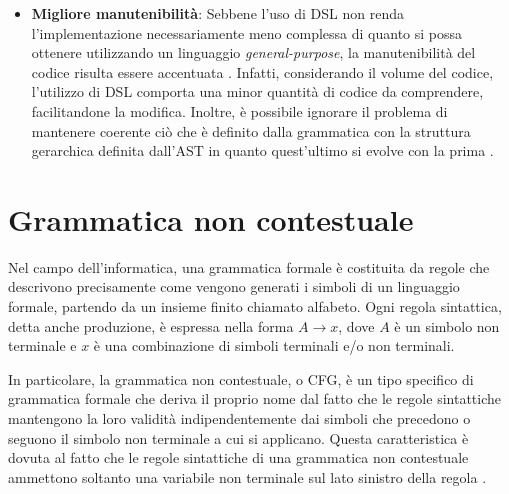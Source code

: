 \documentclass[12pt,a4paper,openright,twoside]{book}
\begin{document}
\begin{itemize}
    qualità del codice generato è chiaramente migliore [...] perché il linguaggio di modellazione è stato progettato per adattarsi 
    all'architettura del nostro terminale''\footnote{Di seguito riportata l'affermazione citata, in lingua originale:``the quality of the 
    generated code is clearly better, simply because the modelling language was designed to fit our terminal architecture''}. Inoltre, 
    l'offuscamento della reale complessità del problema, dovuto all'utilizzo di \ac{DSL}, consente ai nuovi sviluppatori di lavorare ad un 
    alto livello d'astrazione, senza dover conoscere tutti i dettagli inerenti all'implementazione del linguaggio \cite{EADS}. 
    \item \textbf{Migliore manutenibilità}: Sebbene l'uso di \ac{DSL} non renda l'implementazione necessariamente meno complessa di quanto 
    si possa ottenere utilizzando un linguaggio \textit{general-purpose}, la manutenibilità del codice risulta essere accentuata %
    \cite{Klint2010}.  Infatti, considerando il volume del codice, l'utilizzo di \ac{DSL} comporta una minor quantità di codice da comprendere, 
    facilitandone la modifica. Inoltre, è possibile  ignorare il problema di mantenere coerente ciò che è definito dalla grammatica con la 
    struttura gerarchica definita dall'\ac{AST} in quanto quest'ultimo si evolve con la prima \cite{Brabrand2010}.
\end{itemize}

\section{Grammatica non contestuale}
Nel campo dell’informatica, una grammatica formale è costituita da regole che descrivono precisamente come vengono generati i simboli di un 
linguaggio formale, partendo da un insieme finito chiamato alfabeto. Ogni regola sintattica, detta anche produzione, è espressa nella forma 
$A \rightarrow x$, dove $A$ è un simbolo non terminale e $x$ è una combinazione di simboli terminali e/o non terminali.

In particolare, la grammatica non contestuale, o \ac{CFG}, è un tipo specifico di grammatica formale che deriva il proprio nome dal fatto che 
le regole sintattiche mantengono la loro validità indipendentemente dai simboli che precedono o seguono il simbolo non terminale a cui si 
applicano. Questa caratteristica è dovuta al fatto che le regole sintattiche di una grammatica non contestuale ammettono soltanto una variabile 
non terminale sul lato sinistro della regola \cite{Linz2022}.
\end{document}
